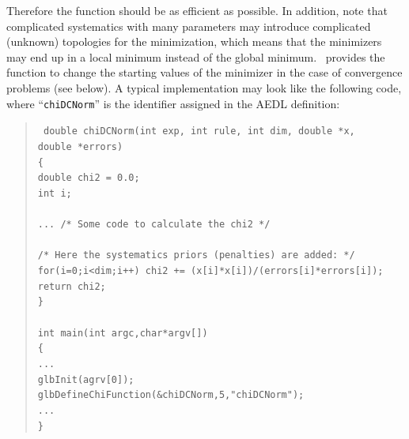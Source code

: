 Therefore the function should be as efficient as possible.
In addition, note that complicated systematics with many parameters may introduce complicated (unknown) topologies for the minimization, which means that the minimizers may
end up in a local minimum instead of the global minimum. \GLOBES\ provides the function  to change the starting values of the minimizer in the case of
 convergence problems (see below).
A typical implementation may look like the following code, where ``{\tt chiDCNorm}'' is the identifier
assigned in the AEDL definition:
\begin{quote}
{\tt
  double chiDCNorm(int exp, int rule, int dim, double *x, \\
  \hspace*{0.5cm} double *errors) \\
  \{ \\
   \hspace*{0.5cm} double chi2 = 0.0; \\
   \hspace*{0.5cm} int i; \\
   \\
   \hspace*{0.5cm} ... /* Some code to calculate the chi2 */ \\
   \\
    \hspace*{0.5cm} /* Here the systematics priors (penalties) are added: */ \\
    \hspace*{0.5cm} for(i=0;i<dim;i++) chi2 += (x[i]*x[i])/(errors[i]*errors[i]);
    \hspace*{0.5cm} return chi2; \\
  \} \\
   \\
  int main(int argc,char*argv[]) \\
 \{ \\ 
  \hspace*{0.5cm} ... \\
  \hspace*{0.5cm} glbInit(agrv[0]); \\
  \hspace*{0.5cm} glbDefineChiFunction(\&chiDCNorm,5,"chiDCNorm"); \\
  \hspace*{0.5cm} ... \\
 \} \\
}
\end{quote}
